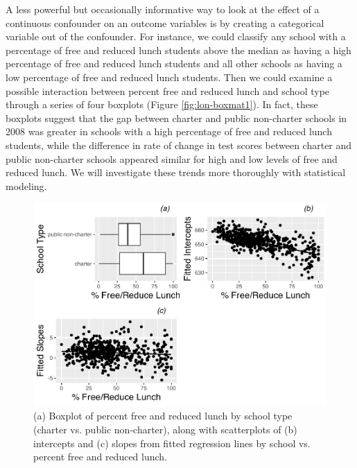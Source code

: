 \documentclass[
]{krantz}
\begin{document}
A less powerful but occasionally informative way to look at the effect of a continuous confounder on an outcome variables is by creating a categorical variable out of the confounder. For instance, we could classify any school with a percentage of free and reduced lunch students above the median as having a high percentage of free and reduced lunch students and all other schools as having a low percentage of free and reduced lunch students. Then we could examine a possible interaction between percent free and reduced lunch and school type through a series of four boxplots (Figure \ref{fig:lon-boxmat1}). In fact, these boxplots suggest that the gap between charter and public non-charter schools in 2008 was greater in schools with a high percentage of free and reduced lunch students, while the difference in rate of change in test scores between charter and public non-charter schools appeared similar for high and low levels of free and reduced lunch. We will investigate these trends more thoroughly with statistical modeling.

\begin{figure}

{\centering \includegraphics[width=0.6\linewidth]{bookdown-BeyondMLR_files/figure-latex/lon-boxcatmat1-1} 

}

\caption{(a) Boxplot of percent free and reduced lunch by school type (charter vs. public non-charter), along with scatterplots of (b) intercepts and (c) slopes from fitted regression lines by school vs. percent free and reduced lunch.}\label{fig:lon-boxcatmat1}
\end{figure}
\end{document}
